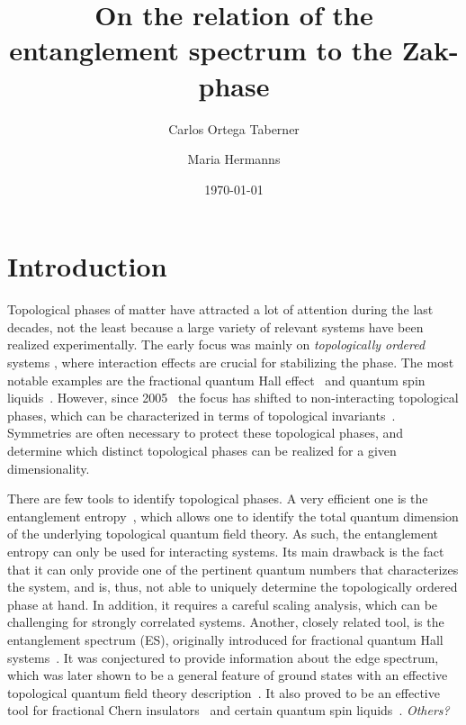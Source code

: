 \documentclass[twocolumn,amsmath,longbibliography,amssymb,superscriptaddress]{revtex4-1}
\newcommand{\mariac}[1]{{\it\color{cyan}#1}}
\begin{document}
		
\title{On the relation of the entanglement spectrum to the Zak-phase}
\author{Carlos Ortega Taberner}

\author{Maria Hermanns}
\date{\today}
		
\maketitle
	


\section{Introduction}
Topological phases of matter have attracted a lot of attention during the last decades, not the least because a large variety of relevant systems have been realized experimentally. 
The early focus was mainly on \emph{topologically ordered} systems \cite{wenbook}, where interaction effects are crucial for stabilizing the phase. 
The most notable examples are the fractional quantum Hall effect~\cite{Tsui1982} and quantum spin liquids~\cite{Balents2010spin}. 
However, since 2005~\cite{kane2005quantum, roy2009topological} the focus has shifted to non-interacting topological phases, which can be characterized in terms of topological invariants~\cite{ryu2010topological}. 
Symmetries are often necessary to protect these topological phases, and determine which distinct topological phases can be realized for a given dimensionality. 

There are few tools to identify topological phases. 
A very efficient one is the entanglement entropy~\cite{Kitaev2006topological, Levin2006detecting}, which allows one to identify the total quantum dimension of the underlying topological quantum field theory. 
As such, the entanglement entropy can only be used for interacting systems. 
Its main drawback is the fact that it can only provide one of the pertinent quantum numbers that characterizes the system, and is, thus,  not able to uniquely determine the topologically ordered phase at hand. 
In addition, it requires a careful scaling analysis, which can be challenging for strongly correlated systems. 
Another, closely related tool, is the entanglement spectrum (ES), originally introduced for fractional quantum Hall systems~\cite{Li2008entanglement}. 
It was conjectured to provide information about the edge spectrum, which was later shown to be a general feature of ground states with an effective topological quantum field theory description~\cite{Qi2012general}. 
It also proved to be an effective tool for fractional Chern insulators~\cite{Regnault2011fractional} and certain quantum spin liquids~\cite{yao2010entanglement}. \mariac{Others?}
\end{document}
